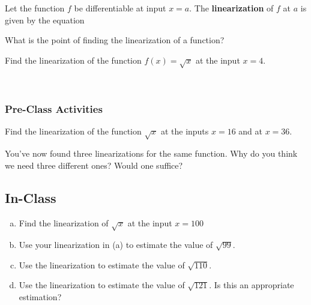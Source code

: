 \documentclass[notes]{subfiles}
\begin{document}
		\begin{defn}[Linearization]
			Let the function $f$ be differentiable at input $x = a$.  The \textbf{linearization} of $f$ at $a$ is given by the equation
		\end{defn}
			
		\begin{question}
			What is the point of finding the linearization of a function?
		\end{question}
			\newpage
		
		\begin{ex}
			Find the linearization of the function $f(x) = \sqrt{x}$ at the input $x = 4$.
		\end{ex}	
			\\
			\newsec $ $
	\subsubsection*{Pre-Class Activities}
			
		\begin{ex}
			Find the linearization of the function $\sqrt{x}$ at the inputs $x = 16$ and at $x = 36$.  
		\end{ex}
			
		\begin{ex}
			You've now found three linearizations for the same function.  Why do you think we need three different ones?  Would one suffice?
		\end{ex}
			\newpage
			
	\subsection*{In-Class}
		\begin{ex}
			\begin{enumerate}[(a)]
				\item Find the linearization of $\sqrt{x}$ at the input $x = 100$
					
				\item Use your linearization in (a) to estimate the value of $\sqrt{99}$.
					
				\item Use the linearization to estimate the value of $\sqrt{110}$.
					
				\item Use the linearization to estimate the value of $\sqrt{121}$.  Is this an appropriate estimation?
			\end{enumerate}
		\end{ex}
			\newpage
		
\end{document}
